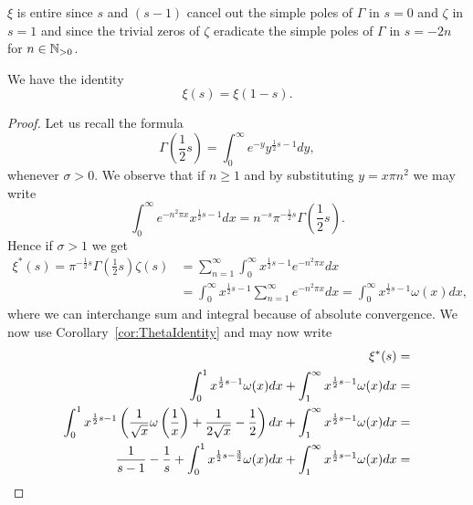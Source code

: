 \begin{remark}
	$\xi$ is entire since $s$ and $(s - 1)$ cancel out the simple poles of $\Gamma$ in $s = 0$ and $\zeta$ in $s = 1$ and since the trivial zeros of $\zeta$ eradicate the simple poles of $\Gamma$ in $s = -2n$ for $n \in \mathbb{N}_{> 0}$.
\end{remark}


\begin{proposition}\label{pro:XiIdentity}
	We have the identity
\begin{equation*}
	\xi(s) = \xi(1 - s).
\end{equation*}
\end{proposition}
\begin{proof}
	Let us recall the formula
\begin{equation*}
	\Gamma(\frac{1}{2}s) = \int _0 ^\infty e^{-y} y^{\frac{1}{2}s - 1} dy,
\end{equation*}	
	whenever $\sigma > 0$. We observe that if $n \geq 1$ and by substituting $y = x \pi n^2$ we may write
\begin{equation*}
	\int _0 ^\infty e^{-n^2 \pi x} x^{\frac{1}{2} s - 1} dx = n^{-s} \pi^{-\frac{1}{2}s}\Gamma(\frac{1}{2}s).
\end{equation*}
	Hence if $\sigma > 1$ we get
\begin{equation*}
\begin{aligned}
	\xi^*(s) = \pi^{-\frac{1}{2}s} \Gamma(\frac{1}{2}s) \zeta(s) 
		&= \sum _{n = 1} ^\infty \int _0 ^\infty x^{\frac{1}{2} s - 1} e^{-n^2 \pi x} dx \\
		&= \int _0 ^\infty x^{\frac{1}{2} s - 1} \sum _{n = 1} ^\infty e^{-n^2 \pi x} dx
		= \int _0 ^\infty x^{\frac{1}{2} s - 1} \omega(x) dx,
\end{aligned}
\end{equation*}
	where we can interchange sum and integral because of absolute convergence. We now use Corollary~\ref{cor:ThetaIdentity} and may now write
\begin{equation*}
\begin{aligned}	
	\xi^*(s) &= \\
		\int _0 ^1 x^{\frac{1}{2} s - 1} \omega(x) dx  + \int _1 ^\infty x^{\frac{1}{2} s - 1} \omega(x) dx &= \\
		\int _0 ^1 x^{\frac{1}{2} s - 1} \cbr{\frac{1}{\sqrt{x}} \omega\cbr{\frac{1}{x}} + \frac{1}{2\sqrt{x}} - \frac{1}{2}} dx  + \int _1 ^\infty x^{\frac{1}{2} s - 1} \omega(x) dx &= \\
		\frac{1}{s - 1} - \frac{1}{s} + \int _0 ^1 x^{\frac{1}{2} s - \frac{3}{2}} \omega(x) dx + \int _1 ^\infty x^{\frac{1}{2} s - 1} \omega(x) dx &= \\

\end{aligned}
\end{equation*}
\end{proof}
